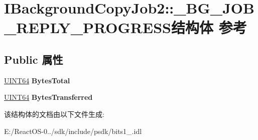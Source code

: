 \hypertarget{struct_i_background_copy_job2_1_1___b_g___j_o_b___r_e_p_l_y___p_r_o_g_r_e_s_s}{}\section{I\+Background\+Copy\+Job2\+:\+:\+\_\+\+B\+G\+\_\+\+J\+O\+B\+\_\+\+R\+E\+P\+L\+Y\+\_\+\+P\+R\+O\+G\+R\+E\+S\+S结构体 参考}
\label{struct_i_background_copy_job2_1_1___b_g___j_o_b___r_e_p_l_y___p_r_o_g_r_e_s_s}
\subsection*{Public 属性}
\begin{DoxyCompactItemize}
\item 
\mbox{\label{struct_i_background_copy_job2_1_1___b_g___j_o_b___r_e_p_l_y___p_r_o_g_r_e_s_s_aa8f796950500646aab985ff75486e412}} 
\hyperlink{_processor_bind_8h_a57be03562867144161c1bfee95ca8f7c}{U\+I\+N\+T64} {\bfseries Bytes\+Total}
\item 
\mbox{\label{struct_i_background_copy_job2_1_1___b_g___j_o_b___r_e_p_l_y___p_r_o_g_r_e_s_s_a8a7cdc2af5fd6a0dada66c390edf2875}} 
\hyperlink{_processor_bind_8h_a57be03562867144161c1bfee95ca8f7c}{U\+I\+N\+T64} {\bfseries Bytes\+Transferred}
\end{DoxyCompactItemize}


该结构体的文档由以下文件生成\+:\begin{DoxyCompactItemize}
\item 
E\+:/\+React\+O\+S-\/0../sdk/include/psdk/bits1\+\_.\+idl\end{DoxyCompactItemize}
